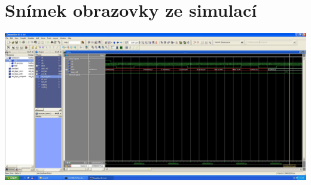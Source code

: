 \documentclass[11pt,a4paper,oneside]{article}
\begin{document}
\section*{Snímek obrazovky ze simulací}
\begin{center}
  \includegraphics[width=0.98\textheight,height=\textwidth,keepaspectratio,angle=-90,origin=c]{screenshot}
\end{center}
\end{document}
